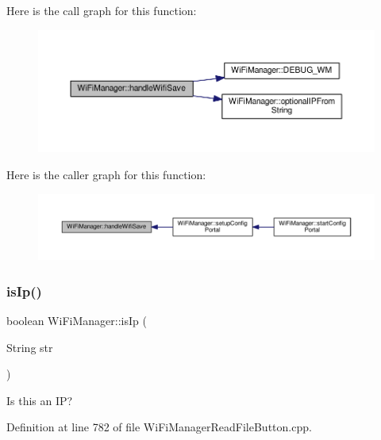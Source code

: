 Here is the call graph for this function\+:
\nopagebreak
\begin{figure}[H]
\begin{center}
\leavevmode
\includegraphics[width=350pt]{d4/dc8/class_wi_fi_manager_a2a8c2b60aa86dfdeab8a1a90f7122dc7_cgraph}
\end{center}
\end{figure}
Here is the caller graph for this function\+:
\nopagebreak
\begin{figure}[H]
\begin{center}
\leavevmode
\includegraphics[width=350pt]{d4/dc8/class_wi_fi_manager_a2a8c2b60aa86dfdeab8a1a90f7122dc7_icgraph}
\end{center}
\end{figure}
\mbox{\label{class_wi_fi_manager_a9c78a8774f746ec22a99d03a53baa607}} 
\subsubsection{\texorpdfstring{is\+Ip()}{isIp()}}
{\footnotesize\ttfamily boolean Wi\+Fi\+Manager\+::is\+Ip (\begin{DoxyParamCaption}\item[{String}]{str }\end{DoxyParamCaption})\hspace{0.3cm}{\ttfamily [private]}}

Is this an IP? 

Definition at line 782 of file Wi\+Fi\+Manager\+Read\+File\+Button.\+cpp.


